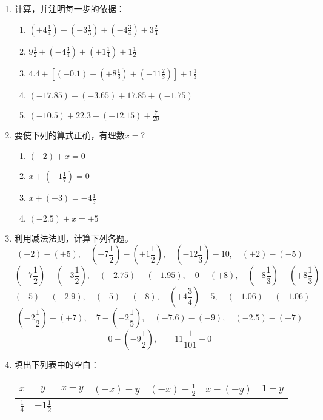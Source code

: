 \begin{enumerate}
	\item 计算，并注明每一步的依据：
	\begin{enumerate}
		\item $\left(+4 \frac{1}{4}\right)+\left(-3 \frac{1}{3}\right)+\left(-4 \frac{3}{4}\right)+3 \frac{2}{3}$
		\item $9 \frac{1}{2}+\left(-4 \frac{3}{4}\right)+\left(+1 \frac{1}{4}\right)+1 \frac{1}{2}$
		\item $4.4+\left[(-0.1)+\left(+8\frac{1}{3}\right)+\left(-11\frac{2}{3}\right)\right]+1\frac{1}{3}$
		\item $(-17.85)+(-3.65)+17.85+(-1.75)$
		\item $(-10.5)+22.3+(-12.15)+\frac{7}{20}$
	\end{enumerate}
	\item 要使下列的算式正确，有理数$x=?$
	\begin{multicols}{2}
		\begin{enumerate}
			\item $(-2)+x=0$
			\item $x+\left(-1\frac{1}{7}\right)=0$
			\item $x+(-3)=-4\frac{1}{3}$
			\item $(-2.5)+x=+5$
		\end{enumerate}
	\end{multicols}
	\item 利用减法法则，计算下列各题。
	\[(+2)-(+5),\quad \left(-7\frac{1}{2}\right)-\left(+1\frac{1}{2}\right),\quad \left(-12\frac{1}{3}\right)-10,\quad (+2)-(-5)\]
	\[\left(-7\frac{1}{2}\right)-\left(-3\frac{1}{2}\right),\quad (-2.75)-(-1.95),\quad 0-(+8),\quad \left(-8\frac{1}{3}\right)-\left(+8\frac{1}{3}\right)\]
	\[(+5)-(-2.9), \quad (-5)-(-8),\quad \left(+4\frac{3}{4}\right)-5,\quad (+1.06)-(-1.06)\]
	\[\left(-2\frac{1}{2}\right)-(+7),\quad 7-\left(-2\frac{1}{5}\right),\quad (-7.6)-(-9),\quad (-2.5)-(-7)\]
	\[0-\left(-9\frac{1}{2}\right),\qquad 11\frac{1}{101}-0\]
	
	\item 填出下列表中的空白：
	\begin{center}
		\begin{tabular}{c|c|c|c|c|c|c}
			\hline
			$x$  &  $y$  &  $x-y$  &  $(-x)-y$  &  $(-x)-\frac{1}{2}$  &  $x-(-y)$  &  $1-y$\\
			\hline
			$\frac{1}{4}$ & $-1\frac{1}{2}$ &&&&&\\
			\hline
		\end{tabular}    
	\end{center}
	

\end{enumerate}
